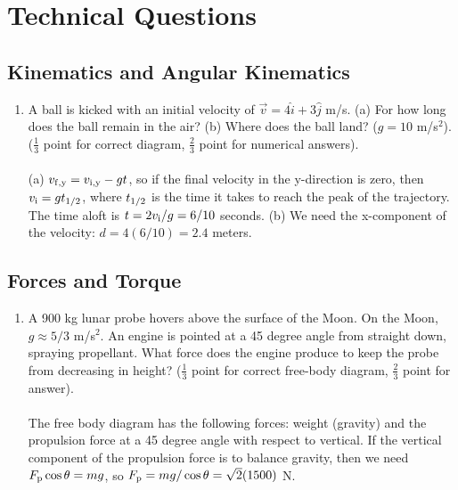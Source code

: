 \documentclass[10pt]{article}
\begin{document}
\section{Technical Questions}
\subsection{Kinematics and Angular Kinematics}
\begin{enumerate}
\item A ball is kicked with an initial velocity of $\vec{v} = 4\hat{i}+3\hat{j}$ m/s. (a) For how long does the ball remain in the air?  (b) Where does the ball land? ($g=10$ m/s$^2$). ($\frac{1}{3}$ point for correct diagram, $\frac{2}{3}$ point for numerical answers). \\ \\
(a) $v_{\rm f,y} = v_{\rm i,y} - gt$, so if the final velocity in the y-direction is zero, then $v_{\rm i} = gt_{\rm 1/2}$, where $t_{\rm 1/2}$ is the time it takes to reach the peak of the trajectory.  The time aloft is $t = 2v_{\rm i}/g = 6/10$ seconds.  (b) We need the x-component of the velocity: $d = 4(6/10) = 2.4$ meters.
\end{enumerate}
\subsection{Forces and Torque}
\begin{enumerate}
\item A 900 kg lunar probe hovers above the surface of the Moon.  On the Moon, $g \approx 5/3$ m/s$^2$.  An engine is pointed at a 45 degree angle from straight down, spraying propellant.  What force does the engine produce to keep the probe from decreasing in height?  ($\frac{1}{3}$ point for correct free-body diagram, $\frac{2}{3}$ point for answer).  \\ \\
The free body diagram has the following forces: weight (gravity) and the propulsion force at a 45 degree angle with respect to vertical.  If the vertical component of the propulsion force is to balance gravity, then we need $F_{\rm p}\cos\theta = mg$, so $F_{\rm p} = mg/\cos\theta = \sqrt{2}(1500)$ N.
\end{enumerate}
\end{document}
